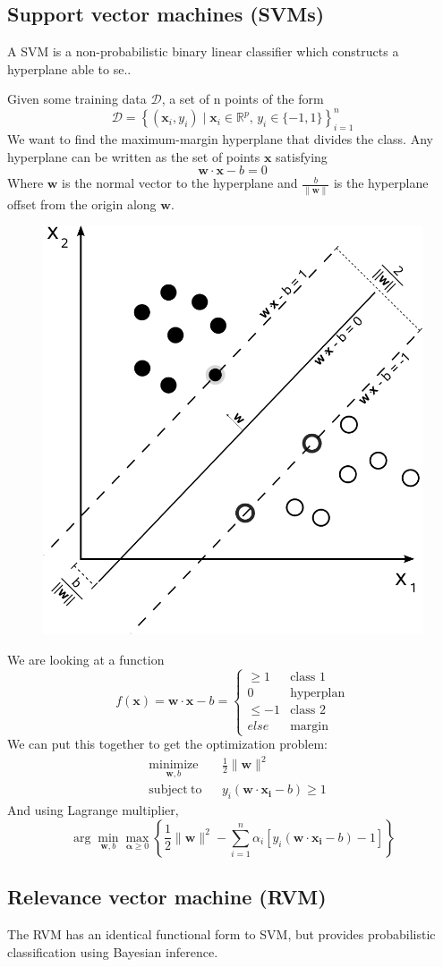 \documentclass[twocolumn]{article}
\numberwithin{equation}{section}
\begin{document}
	\subsection{Support vector machines (SVMs)}
A SVM is a non-probabilistic binary linear classifier which constructs a hyperplane able to se..

Given some training data $\mathcal{D}$, a set of n points of the form
$$\mathcal{D} = \left\{ (\mathbf{x}_i, y_i)\mid\mathbf{x}_i \in \mathbb{R}^p,\, y_i \in \{-1,1\}\right\}_{i=1}^n$$
We want to find the maximum-margin hyperplane that divides the class. Any hyperplane can be written as the set of points $\mathbf{x}$ satisfying 
$$\mathbf{w}\cdot\mathbf{x} - b=0$$
Where $\mathbf{w}$ is the normal vector to the hyperplane and $\tfrac{b}{\|\mathbf{w}\|}$ is the hyperplane offset from the origin along $\mathbf{w}$.

\begin{figure}[H]
	\centering
	\includegraphics[width=.2\textwidth]{Svm_max_sep_hyperplane_with_margin.png}
\end{figure}

We are looking at a function 
$$f(\mathbf{x})=\mathbf{w}\cdot\mathbf{x} - b = \left\{
  \begin{array}{lr}
    \ge 1 	& \text{class 1}\\
    0  		& \text{hyperplan} \\
    \le -1 	& \text{class 2}\\
    else    & \text{margin}
  \end{array}
\right.$$
We can put this together to get the optimization problem:
\begin{align*}
&\underset{\mathbf{w},b}{\operatorname{minimize}}& & \frac{1}{2}\|\mathbf{w}\|^2 \\
&\operatorname{subject\;to}
& &y_i(\mathbf{w}\cdot\mathbf{x_i} - b) \ge 1 
\end{align*}
And using Lagrange multiplier,
$$\arg\min_{\mathbf{w},b } \max_{\boldsymbol{\alpha}\geq 0 } \left\{ \frac{1}{2}\|\mathbf{w}\|^2 - \sum_{i=1}^{n}{\alpha_i[y_i(\mathbf{w}\cdot \mathbf{x_i} - b)-1]} \right\}$$

 
 
 	\subsection{Relevance vector machine (RVM)}
The RVM has an identical functional form to SVM, but provides probabilistic classification using Bayesian inference.
 	
\end{document}
